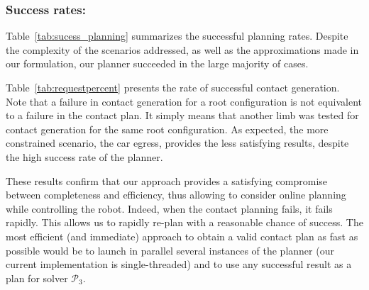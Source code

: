 \subsubsection{Success rates:}
Table~\ref{tab:sucess_planning} summarizes the successful planning rates.
Despite the complexity of the scenarios addressed, as well as the approximations made in our formulation, our planner succeeded in the large majority of cases.

Table~\ref{tab:requestpercent} presents the rate of successful contact generation. Note that a failure in contact generation for a root configuration is not equivalent to a failure in the contact plan. It simply means that another limb was tested for contact generation for the same root configuration.
As expected, the more constrained scenario, the car egress, provides the less satisfying results, despite the high success rate of the planner.

These results confirm that our approach provides a satisfying compromise between completeness and efficiency, thus allowing to consider online planning
while controlling the robot. Indeed, when the contact planning fails, it fails rapidly. This allows us to rapidly re-plan with a reasonable chance of success.
The most efficient (and immediate) approach to obtain a valid contact plan as fast as possible would be to launch in parallel several instances of the planner (our current implementation is single-threaded) and to use any successful result as a plan for solver $\mathcal{P}_3$.


